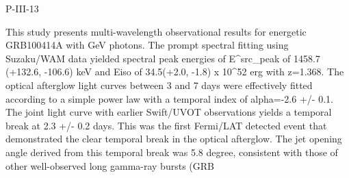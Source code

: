 P-III-13


\bigskip



\bigskip

\noindent This study presents multi-wavelength observational results for energetic
GRB100414A with GeV photons. The prompt spectral fitting using Suzaku/WAM data
yielded spectral peak energies of E^src_peak of 1458.7 (+132.6, -106.6) keV and
Eiso of 34.5(+2.0, -1.8) x 10^52 erg with z=1.368. The optical afterglow light
curves between 3 and 7 days were effectively fitted according to a simple power
law with a temporal index of alpha=-2.6 +/- 0.1. The joint light curve with
earlier Swift/UVOT observations yields a temporal break at 2.3 +/- 0.2 days.
This was the first Fermi/LAT detected event that demonstrated the clear
temporal break in the optical afterglow. The jet opening angle derived from
this temporal break was 5.8 degree, consistent with those of other
well-observed long gamma-ray bursts (GRB

